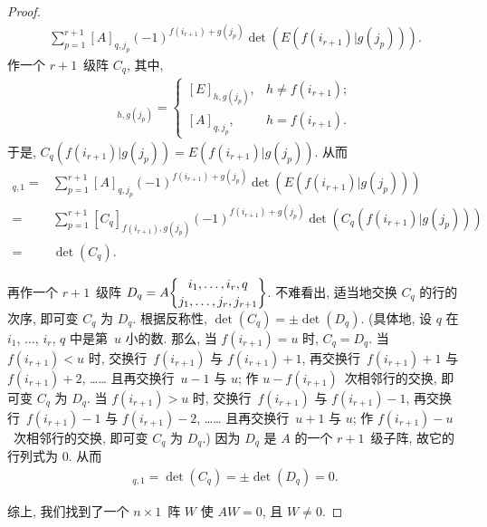 \documentclass[../libro.tex]{subfiles}
\begin{document}
\begin{proof}
\begin{align*}
        \sum_{p=1}^{r+1}
        {[A]_{q,j_p}
            (-1)^{f(i_{r+1})+g(j_p)}
        \det {(E(f(i_{r+1})|g(j_p)))}}.
    \end{align*}
    作一个 \(r+1\)~级阵 \(C_q\), 其中,
    \begin{align*}
        [C_q]_{h,g(j_p)} =
        \begin{cases}
            [E]_{h,g(j_p)},
            & h \neq f(i_{r+1}); \\
            [A]_{q,j_p},
            & h = f(i_{r+1}).
        \end{cases}
    \end{align*}
    于是, \(C_q(f(i_{r+1})|g(j_p))
    = E(f(i_{r+1})|g(j_p))\).
    从而
    \begin{align*}
        [AW]_{q,1}
        = {} &
        \sum_{p=1}^{r+1}
        {[A]_{q,j_p}
            (-1)^{f(i_{r+1})+g(j_p)}
        \det {(E(f(i_{r+1})|g(j_p)))}}
        \\
        = {} &
        \sum_{p=1}^{r+1}
        {[C_q]_{f(i_{r+1}),g(j_p)}
            (-1)^{f(i_{r+1})+g(j_p)}
        \det {(C_q (f(i_{r+1})|g(j_p)))}}
        \\
        = {} &
        \det {(C_q)}.
    \end{align*}

    再作一个 \(r+1\)~级阵
    \(D_q =
        A\submat{i_1,\dots,i_r,q}
    {j_1,\dots,j_r,j_{r+1}}\).
    不难看出, 适当地交换 \(C_q\) 的行的次序,
    即可变 \(C_q\) 为 \(D_q\).
    根据反称性,
    \(\det {(C_q)} = \pm \det {(D_q)}\).
    (具体地, 设 \(q\) 在 %
    \(i_1\), \(\dots\), \(i_r\), \(q\)
    中是第~\(u\) 小的数.
    那么, 当 \(f(i_{r+1}) = u\) 时, \(C_q = D_q\).
    当 \(f(i_{r+1}) < u\) 时,
    交换行~\(f(i_{r+1})\) 与 \(f(i_{r+1})+1\),
    再交换行~\(f(i_{r+1})+1\) 与 \(f(i_{r+1})+2\),
    ……
    且再交换行~\(u-1\) 与 \(u\);
    作 \(u - f(i_{r+1})\)~次相邻行的交换,
    即可变 \(C_q\) 为 \(D_q\).
    当 \(f(i_{r+1}) > u\) 时,
    交换行~\(f(i_{r+1})\) 与 \(f(i_{r+1})-1\),
    再交换行~\(f(i_{r+1})-1\) 与 \(f(i_{r+1})-2\),
    ……
    且再交换行~\(u+1\) 与 \(u\);
    作 \(f(i_{r+1}) - u\)~次相邻行的交换,
    即可变 \(C_q\) 为 \(D_q\).) %
    因为 \(D_q\) 是 \(A\) 的一个 \(r+1\)~级子阵,
    故它的行列式为 \(0\).
    从而
    \begin{align*}
        [AW]_{q,1}
        = \det {(C_q)}
        = \pm \det {(D_q)}
        = 0.
    \end{align*}

    综上, 我们找到了一个 \(n \times 1\)~阵 \(W\)
    使 \(AW = 0\), 且 \(W \neq 0\).
\end{proof}
\end{document}
